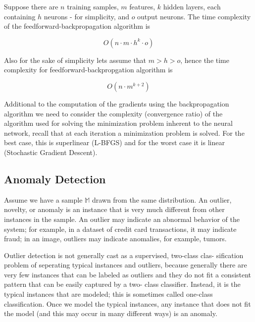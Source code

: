 Suppose there are $n$ training samples, $m$ features, $k$ hidden layers, each containing $h$ neurons - for simplicity, and $o$ output neurons. The time complexity of the feedforward-backpropagation algorithm is 

\begin{equation}
O(n\cdot m \cdot h^k \cdot o)
\label{eq:ann_complexity1}
\end{equation}

Also for the sake of simplicity lets assume that $m>h>o$, hence the time complexity for feedforward-backpropgation algorithm is 

\begin{equation}
O(n\cdot m^{k+2})
\label{eq:ann_complexity2}
\end{equation}

Additional to the computation of the gradients using the backpropagation algorithm we need to consider the complexity (convergence ratio) of the algorithm used for solving the minimization problem inherent to the neural network, recall that at each iteration a minimization problem is solved. For the best case, this is superlinear (L-BFGS) and for the worst case it is linear (Stochastic Gradient Descent).

\subsection{Anomaly Detection}
\label{sec:anomaly_detection_alg}

Assume we have a sample $\mathbb{M}$ drawn from the same distribution. An outlier, novelty, or anomaly is an instance that is very much different from other instances in the sample. An outlier may indicate an abnormal behavior of the system; for example, in a dataset of credit card transactions, it may indicate fraud; in an image, outliers may indicate anomalies, for example, tumors. \cite{intro_to_machine_learning}

Outlier detection is not generally cast as a supervised, two-class clas- sification problem of seperating typical instances and outliers, because generally there are very few instances that can be labeled as outliers and they do not fit a consistent pattern that can be easily captured by a two- class classifier. Instead, it is the typical instances that are modeled; this is sometimes called one-class classification. Once we model the typical instances, any instance that does not fit the model (and this may occur in many different ways) is an anomaly.

